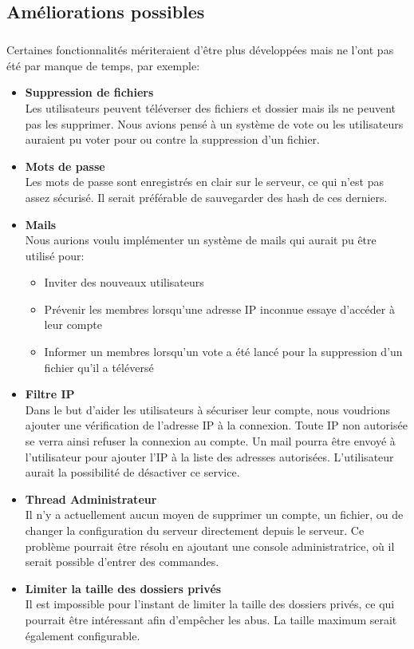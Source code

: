 \documentclass[12pt,a4paper,twoside]{article}
\begin{document}
		\subsection{Améliorations possibles} %
			\subparagraph*{}
				Certaines fonctionnalités mériteraient d'être plus développées mais ne l'ont pas été par manque de temps, par exemple:
				\begin{itemize}
					\item{} \textbf{Suppression de fichiers}\\
						Les utilisateurs peuvent téléverser des fichiers et dossier mais ils ne peuvent pas les supprimer. Nous avions pensé à un système de vote ou les utilisateurs auraient pu voter pour ou contre la suppression d'un fichier.
					\item{} \textbf{Mots de passe}\\
						Les mots de passe sont enregistrés en clair sur le serveur, ce qui n'est pas assez sécurisé. Il serait préférable de sauvegarder des hash de ces derniers.
					\item{} \textbf{Mails}\\
						Nous aurions voulu implémenter un système de mails qui aurait pu être utilisé pour:
						\begin{itemize}
							\item{} Inviter des nouveaux utilisateurs
							\item{} Prévenir les membres lorsqu'une adresse IP inconnue essaye d'accéder à leur compte
							\item{} Informer un membres lorsqu'un vote a été lancé pour la suppression d'un fichier qu'il a téléversé
						\end{itemize}
					\item{} \textbf{Filtre IP}\\
						Dans le but d'aider les utilisateurs à sécuriser leur compte, nous voudrions ajouter une vérification de l'adresse IP à la connexion. Toute IP non autorisée se verra ainsi refuser la connexion au compte. Un mail pourra être envoyé à l'utilisateur pour ajouter l'IP à la liste des adresses autorisées. L'utilisateur aurait la possibilité de désactiver ce service.
					\item{} \textbf{Thread Administrateur}\\
						Il n'y a actuellement aucun moyen de supprimer un compte, un fichier, ou de changer la configuration du serveur directement depuis le serveur. Ce problème pourrait être résolu en ajoutant une console administratrice, où il serait possible d'entrer des commandes.
					\item{} \textbf{Limiter la taille des dossiers privés}\\
						Il est impossible pour l'instant de limiter la taille des dossiers privés, ce qui pourrait être intéressant afin d'empêcher les abus. La taille maximum serait également configurable.
				\end{itemize}
\end{document}
